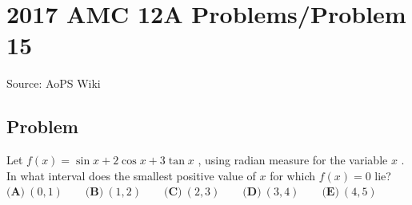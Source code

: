 \documentclass[12pt]{article}
\begin{document}
\section*{{2017 AMC 12A Problems/Problem 15}}
Source: AoPS Wiki

\subsection*{Problem}
Let $f(x) = \sin{x} + 2\cos{x} + 3\tan{x}$ , using radian measure for the variable $x$ . In what interval does the smallest positive value of $x$ for which $f(x) = 0$ lie? $\textbf{(A)}\ (0,1) \qquad \textbf{(B)}\ (1, 2) \qquad\textbf{(C)}\ (2, 3) \qquad\textbf{(D)}\ (3, 4) \qquad\textbf{(E)}\ (4,5)$
\end{document}
